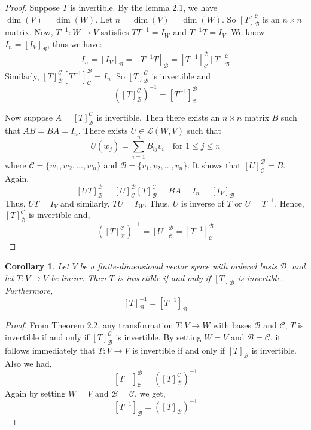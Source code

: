 \documentclass[12pt, a4paper]{article}
\newtheorem{corollary}{Corollary}[theorem]
\theoremstyle{definition}
\theoremstyle{remark}
\begin{document}
 \begin{proof}
     Suppose $T$ is invertible. By the lemma 2.1, we have $\dim(V) = \dim(W)$. Let $n = \dim(V) = \dim(W)$. So $[T]_{\mathscr{B}}^{\mathscr{C}}$ is an $n \times n$ matrix. Now, $T^{-1}: W \to V$ satisfies $TT^{-1} = I_W$ and $T^{-1}T = I_V$. We know $I_n = [I_V]_{\mathscr{B}}$, thus we have:
     $$I_n = [I_V]_{\mathscr{B}} = [T^{-1}T]_{\mathscr{B}} = [T^{-1}]_{\mathscr{C}}^{\mathscr{B}} [T]_{\mathscr{B}}^{\mathscr{C}}$$
     Similarly, $[T]_{\mathscr{B}}^{\mathscr{C}} [T^{-1}]_{\mathscr{C}}^{\mathscr{B}} = I_n$. So $[T]_{\mathscr{B}}^{\mathscr{C}}$ is invertible and
     $$([T]_{\mathscr{B}}^{\mathscr{C}})^{-1} = [T^{-1}]_{\mathscr{C}}^{\mathscr{B}}$$

     Now suppose $A = [T]_{\mathscr{B}}^{\mathscr{C}}$ is invertible. Then there exists an $n \times n$ matrix $B$ such that $AB = BA = I_n$. There exists $U \in \mathscr{L}(W, V)$ such that
     $$U(w_j) = \sum_{i=1}^{n} B_{ij} v_i \quad \text{for } 1 \le j \le n$$
     where $\mathscr{C} = \{w_1, w_2, \dots, w_n\}$ and $\mathscr{B} = \{v_1, v_2, \dots, v_n\}$. It shows that $[U]_{\mathscr{C}}^{\mathscr{B}} = B$. Again,
     $$[UT]_{\mathscr{B}}^{\mathscr{B}} = [U]_{\mathscr{C}}^{\mathscr{B}} [T]_{\mathscr{B}}^{\mathscr{C}} = BA = I_n = [I_V]_{\mathscr{B}}$$
     Thus, $UT = I_V$ and similarly, $TU = I_W$. Thus, $U$ is inverse of $T$ or $U = T^{-1}$. Hence, $[T]_{\mathscr{B}}^{\mathscr{C}}$ is invertible and,
     $$([T]_{\mathscr{B}}^{\mathscr{C}})^{-1} = [U]_{\mathscr{C}}^{\mathscr{B}} = [T^{-1}]_{\mathscr{C}}^{\mathscr{B}}$$
 \end{proof}

 \begin{corollary}
     Let $V$ be a finite-dimensional vector space with ordered basis $\mathscr{B}$, and let $T: V \to V$ be linear. Then $T$ is invertible if and only if $[T]_{\mathscr{B}}$ is invertible. Furthermore,
     $$[T]_{\mathscr{B}}^{-1} = [T^{-1}]_{\mathscr{B}}$$
 \end{corollary}

 \begin{proof}
     From Theorem 2.2, any transformation $T: V \to W$ with bases $\mathscr{B}$ and $\mathscr{C}$, $T$ is invertible if and only if $[T]_{\mathscr{B}}^{\mathscr{C}}$ is invertible. By setting $W = V$ and $\mathscr{B} = \mathscr{C}$, it follows immediately that $T: V \to V$ is invertible if and only if $[T]_{\mathscr{B}}$ is invertible. Also we had,
$$[T^{-1}]_{\mathscr{C}}^{\mathscr{B}} = ([T]_{\mathscr{B}}^{\mathscr{C}})^{-1}$$
Again by setting $W = V$ and $\mathscr{B} = \mathscr{C}$, we get,
$$[T^{-1}]_{\mathscr{B}} = ([T]_{\mathscr{B}})^{-1}$$
\end{proof}
\end{document}
